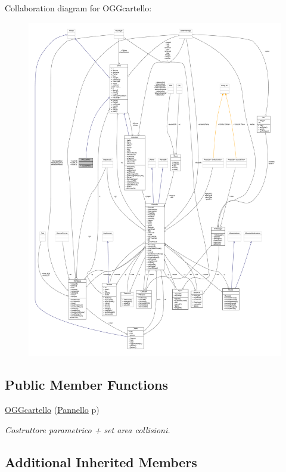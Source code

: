 Collaboration diagram for O\+G\+Gcartello\+:
\nopagebreak
\begin{figure}[H]
\begin{center}
\leavevmode
\includegraphics[width=350pt]{classoggetti_1_1_o_g_gcartello__coll__graph}
\end{center}
\end{figure}
\subsection*{Public Member Functions}
\begin{DoxyCompactItemize}
\item 
\hyperlink{classoggetti_1_1_o_g_gcartello_ad8ef3a2b8459eb976a19d634edb986f9}{O\+G\+Gcartello} (\hyperlink{classa_1_1survival_1_1game_1_1_pannello}{Pannello} p)
\begin{DoxyCompactList}\small\item\em Costruttore parametrico + set area collisioni. \end{DoxyCompactList}\end{DoxyCompactItemize}
\subsection*{Additional Inherited Members}


